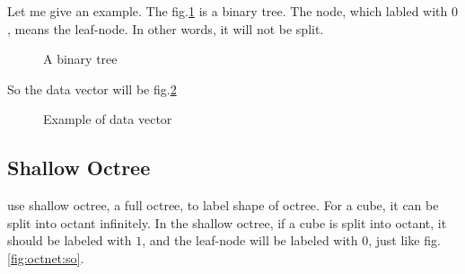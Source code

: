 \documentclass[border=0.5in]{blog}
\begin{document}
    Let me give an example. The fig.\ref{fig:octnet:bintree} is a binary tree.
    The node, which labled with $0$, means the leaf-node. In other words,
    it will not be split. 
    \begin{figure}
        \centering
        \caption{A binary tree}
        \label{fig:octnet:bintree}
    \end{figure}
    So the data vector will be fig.\ref{fig:octnet:vd:eg}
    \begin{figure}
         \centering
         \caption{Example of data vector}
         \label{fig:octnet:vd:eg}
    \end{figure}

    \subsection{Shallow Octree}
    \label{sec:octnet:so}
    
    \citep{DBLP:journals/corr/RieglerUG16} use shallow octree, a full octree, to label shape of octree.
    For a cube, it can be split into octant infinitely. In the shallow octree,
    if a cube is split into octant, it should be labeled with $1$,
    and the leaf-node  will be labeled with $0$, just like fig.\ref{fig:octnet:so}.
    
\end{document}

